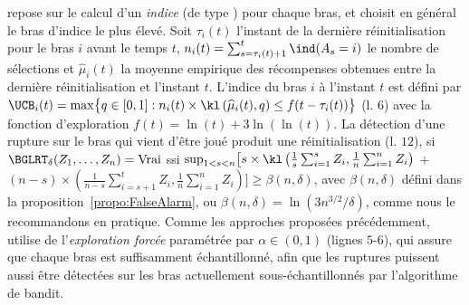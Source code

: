 \documentclass[11pt,english,ignorenonframetext,]{beamer}
\begin{document}
\begin{frame}

  \GLRklUCB{} repose sur le calcul d'un \emph{indice} (de type \klUCB{} \cite{KLUCBJournal}) pour chaque bras,  et choisit en général le bras d'indice le plus élevé. Soit
  $\tau_i(t)$ l'instant de la dernière réinitialisation pour le bras $i$ avant le temps $t$, $n_i(t) = \sum_{s=\tau_i(t)+1}^{t} \ind(A_s=i)$ le nombre de sélections et $\widehat{\mu}_i(t)$
  la moyenne empirique des récompenses obtenues entre la dernière réinitialisation et l'instant $t$. L'indice du bras $i$ à l'instant $t$ est défini par
  $\UCB_i(t) = \max \bigl\{ q\in[0,1] : n_i(t) \times \kl\left(\widehat{\mu}_i(t),q\right) \leq f(t - \tau_i(t)) \bigr\}$ (l. $6$) avec la fonction d'exploration $f(t) = \ln(t) + 3 \ln(\ln(t))$.
  La détection d'une rupture sur le bras qui vient d'être joué
  produit une réinitialisation (l. $12$),
  si $\BGLRT_\delta(Z_1,\dots,Z_n) = \mathrm{Vrai}$ ssi
  $\sup_{1 < s < n} \bigl[s \times \kl \left(\frac{1}{s}\sum_{i=1}^s Z_i, \frac{1}{n} \sum_{i=1}^n Z_i\right)$ $+$ $(n-s) \times (\frac{1}{n-s}\sum_{i=s+1}^t Z_i, \frac{1}{n}\sum_{i=1}^n Z_i) \bigr] \geq \beta(n,\delta)$,
  avec $\beta(n,\delta)$ défini dans la proposition~\ref{propo:FalseAlarm}, ou $\beta(n,\delta) = \ln(3n^{3/2}/\delta)$, comme nous le recommandons en pratique. Comme les approches proposées précédemment,
  \GLRklUCB{} utilise de l'\emph{exploration forcée}
  paramétrée par $\alpha\in(0,1)$
  (lignes $5$-$6$), qui assure que chaque bras est suffisamment échantillonné, afin que les ruptures puissent aussi être détectées sur les bras actuellement sous-échantillonnés par l'algorithme de bandit.

\end{frame}
\end{document}
